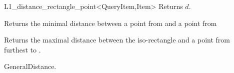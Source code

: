 \begin{ccRefClass}{L1_distance_rectangle_point<QueryItem,Item>}
 {Returns $d$.}


{Returns the minimal distance between a point from  and a point from
}

{Returns the maximal distance between the iso-rectangle  and
a point from  furthest to .}


\ccSeeAlso

GeneralDistance.

\end{ccRefClass}


